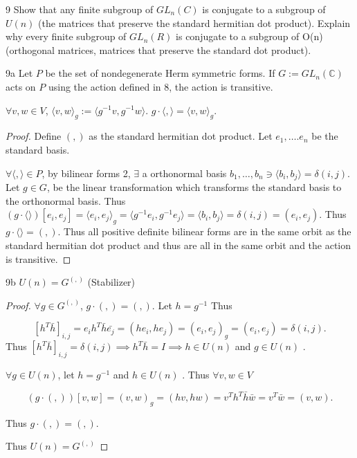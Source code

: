 \documentclass{article}
\newcommand{\C}{\mathbb{C}}
\newcommand{\angles}[1]{{\langle #1 \rangle}}
\begin{document}
\bigskip

\begin{PROB}{9}\label{Problem 9.}
    Show that any finite subgroup of $GL_n(C)$ is conjugate to a subgroup of $U(n)$ (the matrices that preserve the standard hermitian dot product).  Explain why every finite subgroup of $GL_n(R)$ is conjugate to a subgroup of O(n) (orthogonal matrices, matrices that preserve the standard dot product).
\end{PROB}
\begin{claim}{9a}\label{Claim 9a.}
    Let $P$ be the set of nondegenerate Herm symmetric forms. If $G := GL_n(\C)$ acts on $P$ using the action defined in 8, the action is transitive.

    $\forall v, w \in V$, $\angles{v, w}_g := \angles{g^{-1}v , g^{-1}w}$. $g \cdot \angles{,} = \angles{v, w}_g$.
\end{claim}
\begin{proof}
    Define $( , )$ as the standard hermitian dot product. Let $e_1, \dots. e_n$ be the standard basis.  
    
    $\forall \angles{ , } \in P$, by bilinear forms 2, $\exists$ a orthonormal basis $b_1, \dots, b_n \ni \angles{b_i, b_j} = \delta(i, j)$. Let $g \in G$, be the linear transformation which transforms the standard basis to the orthonormal basis. Thus $(g \cdot \angles{})[e_i, e_j] = \angles{e_i, e_j}_g = \angles{g^{-1}e_i, g^{-1}e_j} = \angles{b_i, b_j} = \delta(i, j) = (e_i, e_j)$. Thus $g \cdot \angles{} = (,)$. Thus all positive definite bilinear forms are in the same orbit as the standard hermitian dot product and thus are all in the same orbit and the action is transitive.   
\end{proof}
\begin{claim}{9b}\label{Claim 9b.}
    $U(n) = G^{(,)}$ (Stabilizer) 
\end{claim}
\begin{proof}
    $\forall g \in G^{(,)}$, $g \cdot (,) = (,)$. Let $h = g^{-1}$  Thus     

    \[
        [h^T\bar{h}]_{i,j} = e_i {h}^T \bar{h} \bar{e_j}  = (he_i, he_j) = (e_i, e_j)_g = (e_i, e_j) = \delta(i, j).
    \]
    Thus $[h^T\bar{h}]_{i,j} = \delta(i, j) \implies h^T\bar{h} = I \implies h \in U(n)$ and $g \in U(n)$ .

    $\forall g \in U(n)$, let $h = g^{-1}$ and $h \in U(n)$ . Thus $\forall v, w \in V$ 

    \[
        (g \cdot (,))[v, w] = (v, w)_g = (hv, hw) = v^T h^T \bar{h} \bar{w} = v^T \bar{w} = (v, w).
    \]

    Thus $g \cdot (,) = (,)$. 
    
    Thus $U(n) = G^{(,)}$ 
\end{proof}
\end{document}

